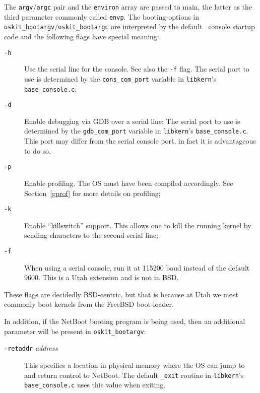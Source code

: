 The \texttt{argv}/\texttt{argc} pair and the \texttt{environ} array
are passed to main, the latter as the third parameter commonly called
\texttt{envp}.
The booting-options in \texttt{oskit_bootargv}/\texttt{oskit_bootargc}
are interpreted by the default \oskit\ console startup code and
the following flags have special meaning:
\begin{description}
        \item[\texttt{-h}]
                Use the serial line for the console.
                See also the \texttt{-f} flag.
                The serial port to use is determined by the
                \texttt{cons_com_port} variable in \texttt{libkern}'s
                \texttt{base_console.c};

        \item[\texttt{-d}]
                Enable debugging via GDB over a serial line;
                The serial port to use is determined by the
                \texttt{gdb_com_port} variable in \texttt{libkern}'s
                \texttt{base_console.c}.
                This port may differ from the serial console port,
                in fact it is advantageous to do so.

        \item[\texttt{-p}]
                Enable profiling.
                The OS must have been compiled accordingly.
                See Section~\ref{gprof} for more details on profiling;

        \item[\texttt{-k}]
                Enable ``killswitch'' support.
                This allows one to kill the running kernel by
                sending characters to the second serial line;

        \item[\texttt{-f}]
                When using a serial console, run it at 115200 baud
                instead of the default 9600.
                This is a Utah extension and is not in BSD\@.
\end{description}
These flags are decidedly BSD-centric, but that is because at Utah
we most commonly boot \oskit{} kernels from the FreeBSD boot-loader.

In addition, if the NetBoot booting program is being used, then
an additional parameter will be present in \texttt{oskit_bootargv}:
\begin{description}
        \item[\texttt{-retaddr} \textsl{address}]
                This specifies a location in physical memory where
                the OS can jump to and return control to NetBoot.
                The default \texttt{_exit} routine in \texttt{libkern}'s
                \texttt{base_console.c} uses this value when exiting.
\end{description}

